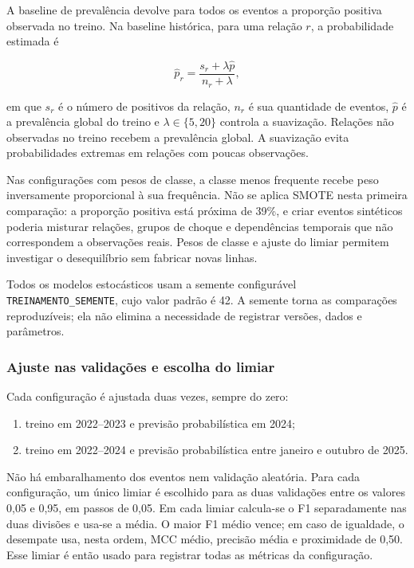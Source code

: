 \documentclass[12pt,a4paper]{article}
\begin{document}
A baseline de prevalência devolve para todos os eventos a proporção positiva
observada no treino. Na baseline histórica, para uma relação $r$, a
probabilidade estimada é

\begin{equation}
    \widehat{p}_{r}=
    \frac{s_{r}+\lambda\widehat{p}}{n_{r}+\lambda},
\end{equation}

em que $s_r$ é o número de positivos da relação, $n_r$ é sua quantidade de
eventos, $\widehat{p}$ é a prevalência global do treino e
$\lambda\in\{5,20\}$ controla a suavização. Relações não observadas no treino
recebem a prevalência global. A suavização evita probabilidades extremas em
relações com poucas observações.

Nas configurações com pesos de classe, a classe menos frequente recebe peso
inversamente proporcional à sua frequência. Não se aplica SMOTE nesta primeira
comparação: a proporção positiva está próxima de 39\%, e criar eventos
sintéticos poderia misturar relações, grupos de choque e dependências temporais
que não correspondem a observações reais. Pesos de classe e ajuste do limiar
permitem investigar o desequilíbrio sem fabricar novas linhas.

Todos os modelos estocásticos usam a semente configurável
\texttt{TREINAMENTO\_SEMENTE}, cujo valor padrão é 42. A semente torna as
comparações reproduzíveis; ela não elimina a necessidade de registrar versões,
dados e parâmetros.

\subsubsection{Ajuste nas validações e escolha do limiar}

Cada configuração é ajustada duas vezes, sempre do zero:

\begin{enumerate}
    \item treino em 2022--2023 e previsão probabilística em 2024;
    \item treino em 2022--2024 e previsão probabilística entre janeiro e
    outubro de 2025.
\end{enumerate}

Não há embaralhamento dos eventos nem validação aleatória. Para cada
configuração, um único limiar é escolhido para as duas validações entre os
valores 0,05 e 0,95, em passos de 0,05. Em cada limiar calcula-se o F1
separadamente nas duas divisões e usa-se a média. O maior F1 médio vence; em
caso de igualdade, o desempate usa, nesta ordem, MCC médio, precisão média e
proximidade de 0,50. Esse limiar é então usado para registrar todas as métricas
da configuração.
\end{document}
